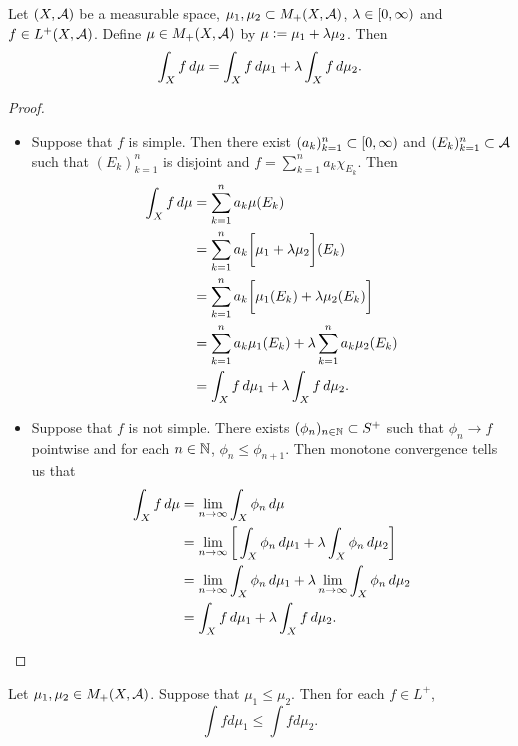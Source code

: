 \documentclass{book}
\begin{document}
	\begin{ex}  
		Let $(X, \mathcal{A})$ be a measurable space, $\mu_1, \mu_2 \subset M_+(X, \mathcal{A})$, $\lambda \in [0,\infty)$ and $f \in L^+(X, \mathcal{A})$. Define $\mu \in M_+(X, \mathcal{A})$ by $\mu \vcentcolon= \mu_1 + \lambda \mu_2$. Then 
		$$\int_X f \, d \mu = \int_X f \, d \mu_1 + \lambda \int_X f \, d \mu_2.$$  
	\end{ex}

	\begin{proof}\
		\begin{itemize}
			\item Suppose that $f$ is simple. Then there exist $(a_k)_{k=1}^n \subset [0,\infty)$ and $(E_k)_{k=1}^n \subset \mathcal{A}$ such that $(E_k)_{k=1}^n $ is disjoint and $f = \sum\limits_{k =1}^n a_k \chi_{E_k}$. Then 
			\begin{align*}
				\int_X f \, d \mu
				& = \sum \limits_{k =1}^n a_k \mu(E_k) \\
				& = \sum \limits_{k =1}^n a_k \bigg[ \mu_1 + \lambda \mu_2 \bigg](E_k) \\
				& = \sum \limits_{k =1}^n a_k \bigg[ \mu_1(E_k) + \lambda \mu_2(E_k) \bigg] \\
				& = \sum \limits_{k =1}^n a_k\mu_1(E_k) + \lambda \sum \limits_{k =1}^n a_k \mu_2(E_k) \\
				& = \int_X f \, d \mu_1 + \lambda \int_X f \, d \mu_2.
			\end{align*}
			\item Suppose that $f$ is not simple. There exists $(\phi_n)_{n \in \mathbb{N}} \subset S^+$ such that $\phi_n \rightarrow f$ pointwise and for each $n \in \mathbb{N}$, $\phi_n \leq \phi_{n+1}$. Then monotone convergence tells us that 
			\begin{align*}
				\int_X f \, d \mu 
				& = \lim \limits_{n \rightarrow \infty} \int_X \phi_n \, d \mu \\
				& = \lim \limits_{n \rightarrow \infty} \bigg[ \int_X \phi_n \, d \mu_1 + \lambda \int_X \phi_n \, d \mu_2  \bigg] \\
				& = \lim \limits_{n \rightarrow \infty} \int_X \phi_n \, d \mu_1 + \lambda \lim \limits_{n \rightarrow \infty} \int_X \phi_n \, d \mu_2 \\
				& = \int_X f \, d \mu_1 + \lambda \int_X f \, d \mu_2.
			\end{align*}
		\end{itemize}
	\end{proof}
	
	\begin{ex} 
		Let $\mu_1, \mu_2 \in M_+(X,\mathcal{A})$. Suppose that $\mu_1 \leq \mu_2$. Then for each $f \in L^+$, 
		$$\int f d\mu_1 \leq \int f d\mu_2.$$
	\end{ex}
	
\end{document}

